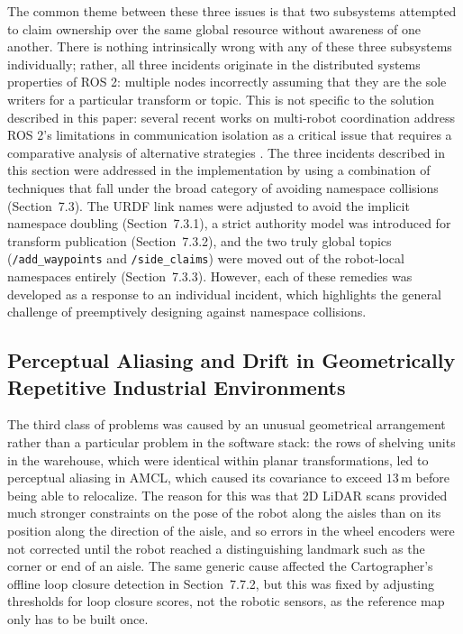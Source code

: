 The common theme between these three issues is that two subsystems attempted to claim ownership over the same global resource without awareness of one another. There is nothing intrinsically wrong with any of these three subsystems individually; rather, all three incidents originate in the distributed systems properties of ROS 2: multiple nodes incorrectly assuming that they are the sole writers for a particular transform or topic. This is not specific to the solution described in this paper: several recent works on multi-robot coordination address ROS 2's limitations in communication isolation as a critical issue that requires a comparative analysis of alternative strategies \cite{naury2025communication}. The three incidents described in this section were addressed in the implementation by using a combination of techniques that fall under the broad category of avoiding namespace collisions (Section~7.3). The URDF link names were adjusted to avoid the implicit namespace doubling (Section~7.3.1), a strict authority model was introduced for transform publication (Section~7.3.2), and the two truly global topics (\texttt{/add\_waypoints} and \texttt{/side\_claims}) were moved out of the robot-local namespaces entirely (Section~7.3.3). However, each of these remedies was developed as a response to an individual incident, which highlights the general challenge of preemptively designing against namespace collisions.

\subsection{Perceptual Aliasing and Drift in Geometrically Repetitive Industrial Environments}

The third class of problems was caused by an unusual geometrical arrangement rather than a particular problem in the software stack: the rows of shelving units in the warehouse, which were identical within planar transformations, led to perceptual aliasing in AMCL, which caused its covariance to exceed $13\,\text{m}$ before being able to relocalize. The reason for this was that 2D LiDAR scans provided much stronger constraints on the pose of the robot along the aisles than on its position along the direction of the aisle, and so errors in the wheel encoders were not corrected until the robot reached a distinguishing landmark such as the corner or end of an aisle. The same generic cause affected the Cartographer's offline loop closure detection in Section~7.7.2, but this was fixed by adjusting thresholds for loop closure scores, not the robotic sensors, as the reference map only has to be built once.

